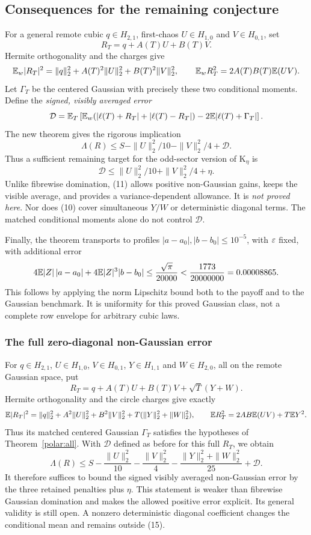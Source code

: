 \subsection{Consequences for the remaining conjecture}
For a general remote cubic $q\in H_{2,1}$, first-chaos $U\in H_{1,0}$
and $V\in H_{0,1}$, set
\[
 R_T=q+A(T)U+B(T)V.
\]
Hermite orthogonality and the charges give
\[
 \mathbb E_w|R_T|^2=\|q\|_2^2+A(T)^2\|U\|_2^2+B(T)^2\|V\|_2^2,
 \qquad \mathbb E_w R_T^2=2A(T)B(T)\mathbb E(UV).
\]
Let $\Gamma_T$ be the centered Gaussian with precisely these two
conditional moments. Define the \emph{signed, visibly averaged error}
\[
 \mathcal D=\mathbb E_T\left[
  \mathbb E_w(|\ell(T)+R_T|+|\ell(T)-R_T|)
                   -2\mathbb E|\ell(T)+\Gamma_T|\right].
\]
The new theorem gives the rigorous implication
\[
 \Lambda(R)\le S-\|U\|_2^2/10-\|V\|_2^2/4+\mathcal D.     \tag{10}
\]
Thus a sufficient remaining target for the odd-sector version of
K$_\eta$ is
\[
 \boxed{\quad\mathcal D\le\|U\|_2^2/10+\|V\|_2^2/4+\eta.\quad} \tag{11}
\]
Unlike fibrewise domination, (11) allows positive non-Gaussian gains,
keeps the visible average, and provides a variance-dependent allowance.
It is \emph{not proved here}. Nor does (10) cover simultaneous $Y/W$
or deterministic diagonal terms. The matched conditional moments alone
do not control $\mathcal D$.

Finally, the theorem transports to profiles
$|a-a_0|,|b-b_0|\le10^{-5}$, with $\varepsilon$ fixed, with additional error
\[
 4\mathbb E|Z|\,|a-a_0|+4\mathbb E|Z|^3|b-b_0|
 \le\frac{\sqrt\pi}{20000}<\frac{1773}{20000000}=0.00008865.
\]
This follows by applying the norm Lipschitz bound both to the payoff
and to the Gaussian benchmark. It is uniformity for this proved
Gaussian class, not a complete row envelope for arbitrary cubic laws.

\subsubsection{The full zero-diagonal non-Gaussian error}
For $q\in H_{2,1}$, $U\in H_{1,0}$, $V\in H_{0,1}$,
$Y\in H_{1,1}$ and $W\in H_{2,0}$, all on the remote Gaussian space,
put
\[
 R_T=q+A(T)U+B(T)V+\sqrt T(Y+W).
\]
Hermite orthogonality and the circle charges give exactly
\[
 \mathbb E|R_T|^2=\|q\|_2^2+A^2\|U\|_2^2+B^2\|V\|_2^2
                  +T(\|Y\|_2^2+\|W\|_2^2),
 \qquad \mathbb E R_T^2=2AB\mathbb E(UV)+T\mathbb E Y^2.
\]
Thus its matched centered Gaussian $\Gamma_T$ satisfies the hypotheses
of Theorem~\ref{polar:all}. With $\mathcal D$ defined as before for
this full $R_T$, we obtain
\[
 \Lambda(R)\le S-\frac{\|U\|_2^2}{10}-\frac{\|V\|_2^2}{4}
 -\frac{\|Y\|_2^2+\|W\|_2^2}{25}+\mathcal D.              \tag{15}
\]
It therefore suffices to bound the signed visibly averaged
non-Gaussian error by the three retained penalties plus $\eta$.
This statement is weaker than fibrewise Gaussian domination and
makes the allowed positive error explicit. Its general validity is
still open. A nonzero deterministic diagonal coefficient changes the
conditional mean and remains outside (15).


